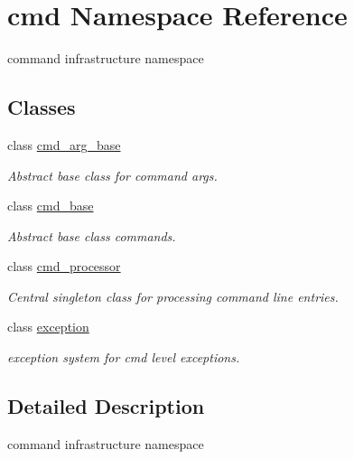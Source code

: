 \hypertarget{namespacecmd}{\section{cmd Namespace Reference}
\label{namespacecmd}
}


command infrastructure namespace  


\subsection*{Classes}
\begin{DoxyCompactItemize}
\item 
class \hyperlink{classcmd_1_1cmd__arg__base}{cmd\-\_\-arg\-\_\-base}
\begin{DoxyCompactList}\small\item\em Abstract base class for command args. \end{DoxyCompactList}\item 
class \hyperlink{classcmd_1_1cmd__base}{cmd\-\_\-base}
\begin{DoxyCompactList}\small\item\em Abstract base class commands. \end{DoxyCompactList}\item 
class \hyperlink{classcmd_1_1cmd__processor}{cmd\-\_\-processor}
\begin{DoxyCompactList}\small\item\em Central singleton class for processing command line entries. \end{DoxyCompactList}\item 
class \hyperlink{classcmd_1_1exception}{exception}
\begin{DoxyCompactList}\small\item\em exception system for cmd level exceptions. \end{DoxyCompactList}\end{DoxyCompactItemize}


\subsection{Detailed Description}
command infrastructure namespace 